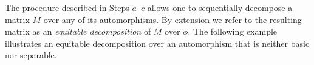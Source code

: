 \documentclass[preprint,12pt]{elsarticle}
\theoremstyle{definition}
\theoremstyle{remark}
\renewcommand{\emph}{\textit}
\begin{document}

\par\endgroup

\vspace{0.1in}

\noindent The procedure described in Steps $a$--$c$ allows one to sequentially decompose a matrix $M$ over any of its automorphisms. By extension we refer to the resulting matrix as an \emph{equitable decomposition} of $M$ over $\phi$. The following example illustrates an equitable decomposition over an automorphism that is neither basic nor separable.
\end{document}

